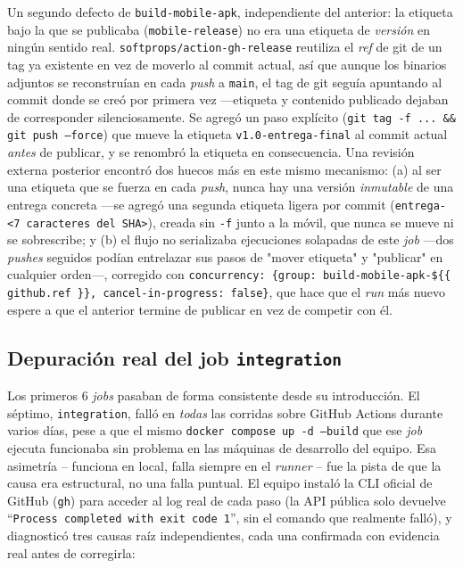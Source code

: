 Un segundo defecto de \texttt{build-mobile-apk}, independiente del anterior: la etiqueta bajo la
que se publicaba (\texttt{mobile-release}) no era una etiqueta de \emph{versión} en ningún
sentido real. \texttt{softprops/action-gh-release} reutiliza el \emph{ref} de git de un tag ya
existente en vez de moverlo al commit actual, así que aunque los binarios adjuntos se
reconstruían en cada \emph{push} a \texttt{main}, el tag de git seguía apuntando al commit donde
se creó por primera vez —etiqueta y contenido publicado dejaban de corresponder silenciosamente.
Se agregó un paso explícito (\texttt{git tag -f ... \&\& git push --force}) que mueve la etiqueta
\texttt{v1.0-entrega-final} al commit actual \emph{antes} de publicar, y se renombró la etiqueta
en consecuencia. Una revisión externa posterior encontró dos huecos más en este mismo mecanismo:
(a) al ser una etiqueta que se fuerza en cada \emph{push}, nunca hay una versión \emph{inmutable}
de una entrega concreta —se agregó una segunda etiqueta ligera por commit
(\texttt{entrega-<7 caracteres del SHA>}), creada sin \texttt{-f} junto a la móvil, que nunca se
mueve ni se sobrescribe; y (b) el flujo no serializaba ejecuciones solapadas de este \emph{job}
—dos \emph{pushes} seguidos podían entrelazar sus pasos de "mover etiqueta" y "publicar" en
cualquier orden—, corregido con \texttt{concurrency: \{group: build-mobile-apk-\$\{\{ github.ref
\}\}, cancel-in-progress: false\}}, que hace que el \emph{run} más nuevo espere a que el anterior
termine de publicar en vez de competir con él.

\subsection{Depuración real del job \texttt{integration}}
\label{sec:cicd-depuracion}

Los primeros 6 \emph{jobs} pasaban de forma consistente desde su introducción. El séptimo,
\texttt{integration}, falló en \emph{todas} las corridas sobre GitHub Actions durante varios
días, pese a que el mismo \texttt{docker compose up -d --build} que ese \emph{job} ejecuta
funcionaba sin problema en las máquinas de desarrollo del equipo. Esa asimetría -- funciona en
local, falla siempre en el \emph{runner} -- fue la pista de que la causa era estructural, no una
falla puntual. El equipo instaló la CLI oficial de GitHub (\texttt{gh}) para acceder al log real
de cada paso (la API pública solo devuelve \enquote{\texttt{Process completed with exit code 1}},
sin el comando que realmente falló), y diagnosticó tres causas raíz independientes, cada una
confirmada con evidencia real antes de corregirla:


